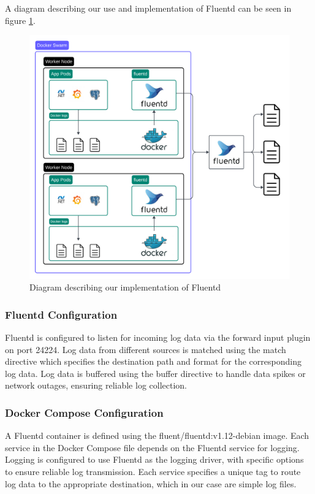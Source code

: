 A diagram describing our use and implementation of Fluentd can be seen in figure \ref{fig:logging2}.
\begin{figure}[H]
	\centering
	\includegraphics[width=1\textwidth]{Logging2.png}
	\caption{Diagram describing our implementation of Fluentd}
	\label{fig:logging2}
\end{figure}

\subsubsection*{Fluentd Configuration}

Fluentd is configured to listen for incoming log data via the forward input plugin on port 24224. 
Log data from different sources is matched using the match directive which specifies the destination path and format for the corresponding log data. 
Log data is buffered using the buffer directive to handle data spikes or network outages, ensuring reliable log collection.

\subsubsection*{Docker Compose Configuration}

A Fluentd container is defined using the fluent/fluentd:v1.12-debian image. 
Each service in the Docker Compose file depends on the Fluentd service for logging. 
Logging is configured to use Fluentd as the logging driver, with specific options to ensure reliable log transmission.
Each service specifies a unique tag to route log data to the appropriate destination, which in our case are simple log files.

